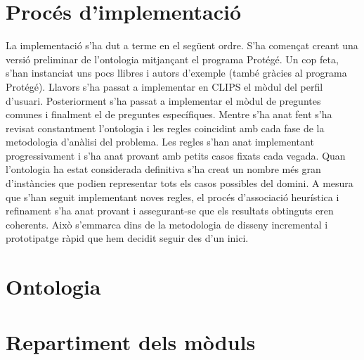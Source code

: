 
\section{Procés d'implementació}

La implementació s'ha dut a terme en el següent ordre. S'ha començat creant una versió preliminar de l'ontologia mitjançant el programa Protégé. Un cop feta, s'han instanciat uns pocs llibres i autors d'exemple (també gràcies al programa Protégé). Llavors s'ha passat a implementar en CLIPS el mòdul del perfil d'usuari. Posteriorment s'ha passat a implementar el mòdul de preguntes comunes i finalment el de preguntes específiques. Mentre s'ha anat fent s'ha revisat constantment l'ontologia i les regles coincidint amb cada fase de la metodologia d'anàlisi del problema. Les regles s'han anat implementant progressivament i s'ha anat provant amb petits casos fixats cada vegada. Quan l'ontologia ha estat considerada definitiva s'ha creat un nombre més gran d'instàncies que podien representar tots els casos possibles del domini. A mesura que s'han seguit implementant noves regles, el procés d'associació heurística i refinament s'ha anat provant i assegurant-se que els resultats obtinguts eren coherents. Això s'emmarca dins de la metodologia de disseny incremental i prototipatge ràpid que hem decidit seguir des d'un inici.

\section{Ontologia}

\section{Repartiment dels mòduls}